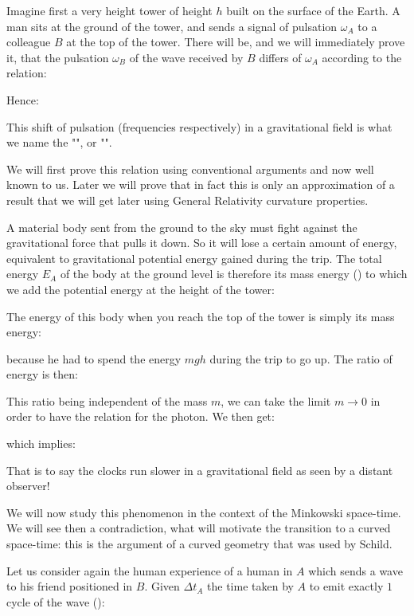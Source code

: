 	Imagine first a very height tower of height $h$ built on the surface of the Earth. A man sits at the ground of the tower, and sends a signal of pulsation $\omega_A$ to a colleague $B$ at the top of the tower. There will be, and we will immediately prove it, that the pulsation $\omega_B$ of the wave received by $B$ differs of $\omega_A$ according to the relation:
	
	Hence:
	
	This shift of pulsation (frequencies respectively) in a gravitational field is what we name the "", or "".
	
	We will first prove this relation using conventional arguments and now well known to us. Later we will prove that in fact this is only an approximation of a result that we will get later using General Relativity curvature properties.
	
	A material body sent from the ground to the sky must fight against the gravitational force that pulls it down. So it will lose a certain amount of energy, equivalent to gravitational potential energy gained during the trip. The total energy $E_A$ of the body at the ground level is therefore its mass energy () to which we add the potential energy at the height of the tower:
	
	The energy of this body when you reach the top of the tower is simply its mass energy:
	
	because he had to spend the energy $mgh$ during the trip to go up. The ratio of energy is then:
	
	This ratio being independent of the mass $m$, we can take the limit $m\rightarrow 0$ in order to have the relation for the photon. We then get:
	
	which implies:
	
	That is to say the clocks run slower in a gravitational field as seen by a distant observer!
	
	We will now study this phenomenon in the context of the Minkowski space-time. We will see then a contradiction, what will motivate the transition to a curved space-time: this is the argument of a curved geometry that was used by Schild.

	Let us consider again the human experience of a human in $A$ which sends a wave to his friend positioned in $B$. Given $\Delta t_A$ the time taken by $A$ to emit exactly $1$ cycle of the wave ():
	
